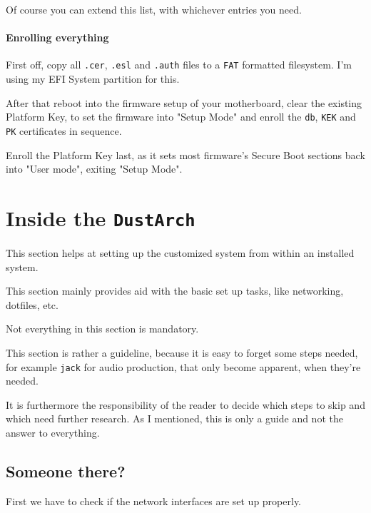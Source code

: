 \documentclass[10pt]{dustdoc}
\begin{document}
Of course you can extend this list, with whichever entries you need.

\subsubsection{Enrolling everything}
\label{sec:enrolling-everything}

First off, copy all \texttt{.cer}, \texttt{.esl} and \texttt{.auth} files to a \texttt{FAT} formatted filesystem.
I’m using my EFI System partition for this.

After that reboot into the firmware setup of your motherboard, clear the existing Platform Key, to set the firmware into "Setup Mode" and enroll the \texttt{db}, \texttt{KEK} and \texttt{PK} certificates in sequence.

\begin{NOTE}
    Enroll the Platform Key last, as it sets most firmware’s Secure Boot sections back into "User mode", exiting "Setup Mode".
\end{NOTE}

\chapter{Inside the \texttt{DustArch}}
\label{sec:inside-the-dustarch}

This section helps at setting up the customized system from within an installed system.

This section mainly provides aid with the basic set up tasks, like networking, dotfiles, etc.

\begin{NOTE}
    Not everything in this section is mandatory.

    This section is rather a guideline, because it is easy to forget some steps needed, for example \texttt{jack} for audio production, that only become apparent, when they’re needed.

    It is furthermore the responsibility of the reader to decide which steps to skip and which need further research.
    As I mentioned, this is only a guide and not the answer to everything.
\end{NOTE}

\section{Someone there?}
\label{sec:someone-there}

First we have to check if the network interfaces are set up properly.
\end{document}
